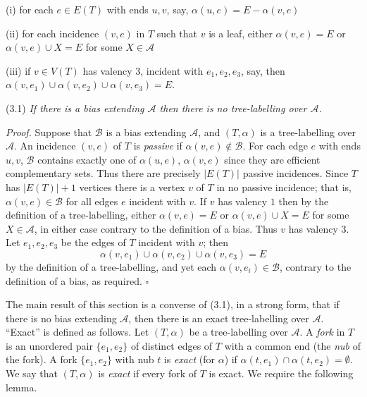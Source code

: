 \hspace*{12pt}(i) for each $e\in E(T)$ with ends $u, v$, say, $\alpha(u, e) = E - \alpha(v, e)$

\hspace*{12pt}(ii) for each incidence $(v, e)$ in $T$ such that $v$ is a leaf, either $\alpha(v, e) = E$ or $\alpha(v, e)\cup X = E$ for some $X\in \mathscr{A}$

\hspace*{12pt}(iii) if $v\in V(T)$ has valency $3$, incident with $e_1, e_2, e_3$, say, then $\alpha(v, e_1)\cup \alpha(v, e_2)\cup \alpha(v, e_3) = E$.

\stmt
(3.1) \textit{If there is a bias extending $\mathscr{A}$ then there is no tree-labelling over $\mathscr{A}$.}

\textit{Proof.} Suppose that $\mathscr{B}$ is a bias extending $\mathscr{A}$, and $(T, \alpha)$ is a tree-labelling over $\mathscr{A}$. An incidence $(v, e)$ of $T$ is \textit{passive} if $\alpha(v, e)\notin \mathscr{B}$. For each edge $e$ with ends $u, v$, $\mathscr{B}$ contains exactly one of $\alpha(u, e)$, $\alpha(v, e)$ since they are efficient complementary sets. Thus there are precisely $|E(T)|$ passive incidences. Since $T$ has $|E(T)| + 1$ vertices there is a vertex $v$ of $T$ in no passive incidence; that is, $\alpha(v, e)\in \mathscr{B}$ for all edges $e$ incident with $v$. If $v$ has valency $1$ then by the definition of a tree-labelling, either $\alpha(v, e) = E$ or $\alpha(v, e)\cup X = E$ for some $X\in \mathscr{A}$, in either case contrary to the definition of a bias. Thus $v$ has valency $3$. Let $e_1, e_2, e_3$ be the edges of $T$ incident with $v$; then
\begin{equation*}
\alpha(v, e_1)\cup \alpha(v, e_2)\cup \alpha(v, e_3) = E
\end{equation*}
by the definition of a tree-labelling, and yet each $\alpha(v, e_i)\in \mathscr{B}$, contrary to the definition of a bias, as required. $\square$

The main result of this section is a converse of (3.1), in a strong form, that if there is no bias extending $\mathscr{A}$, then there is an exact tree-labelling over $\mathscr{A}$. ``Exact'' is defined as follows. Let $(T, \alpha)$ be a tree-labelling over $\mathscr{A}$. A \textit{fork} in $T$ is an unordered pair $\{e_1, e_2\}$ of distinct edges of $T$ with a common end (the \textit{nub} of the fork). A fork $\{e_1, e_2\}$ with nub $t$ is \textit{exact} (for $\alpha$) if $\alpha(t, e_1)\cap \alpha(t, e_2) = \emptyset$. We say that $(T, \alpha)$ is \textit{exact} if every fork of $T$ is exact. We require the following lemma.

